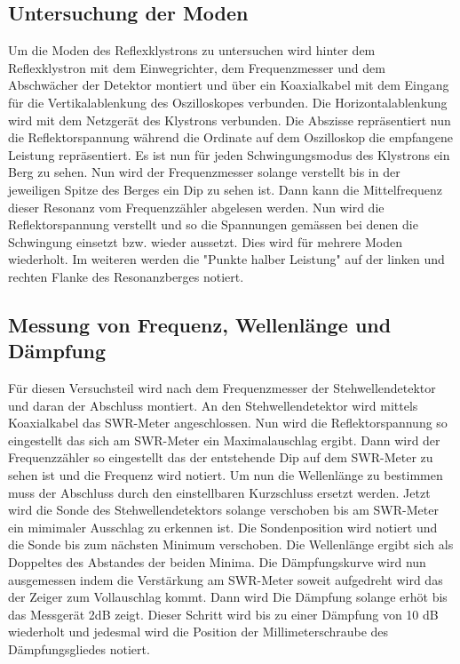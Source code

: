 \subsection{Untersuchung der Moden}
\label{sec:moden}
Um die Moden des Reflexklystrons zu untersuchen wird hinter dem Reflexklystron mit dem Einwegrichter, dem 
Frequenzmesser und dem Abschwächer der Detektor montiert und über ein Koaxialkabel mit dem Eingang
für die Vertikalablenkung des Oszilloskopes verbunden. Die Horizontalablenkung wird mit dem Netzgerät des Klystrons
verbunden. Die Abszisse repräsentiert nun die Reflektorspannung während die Ordinate auf dem Oszilloskop
die empfangene Leistung repräsentiert. Es ist nun für jeden Schwingungsmodus des Klystrons ein Berg zu sehen.
Nun wird der Frequenzmesser solange verstellt bis in der jeweiligen Spitze des Berges ein Dip zu sehen ist.
Dann kann die Mittelfrequenz dieser Resonanz vom Frequenzzähler abgelesen werden. Nun wird die Reflektorspannung
verstellt und so die Spannungen gemässen bei denen die Schwingung einsetzt bzw. wieder aussetzt. Dies wird für mehrere
Moden wiederholt. Im weiteren werden die "Punkte halber Leistung" auf der linken und rechten Flanke des 
Resonanzberges notiert.

\subsection{Messung von Frequenz, Wellenlänge und Dämpfung}
\label{sec:frequenzmessung}
Für diesen Versuchsteil wird nach dem Frequenzmesser der Stehwellendetektor und daran der Abschluss montiert.
An den Stehwellendetektor wird mittels Koaxialkabel das SWR-Meter angeschlossen. Nun wird die Reflektorspannung
so eingestellt das sich am SWR-Meter ein Maximalauschlag ergibt. Dann wird der Frequenzzähler so eingestellt das 
der entstehende Dip auf dem SWR-Meter zu sehen ist und die Frequenz wird notiert. Um nun die Wellenlänge zu bestimmen
muss der Abschluss durch den einstellbaren Kurzschluss ersetzt werden. Jetzt wird die Sonde des Stehwellendetektors
solange verschoben bis am SWR-Meter ein mimimaler Ausschlag zu erkennen ist. Die Sondenposition wird notiert und die
Sonde bis zum nächsten Minimum verschoben. Die Wellenlänge ergibt sich als Doppeltes des Abstandes der beiden 
Minima. Die Dämpfungskurve wird nun ausgemessen indem die Verstärkung am SWR-Meter soweit aufgedreht wird das 
der Zeiger zum Vollauschlag kommt. Dann wird Die Dämpfung solange erhöt bis das Messgerät 2dB zeigt. Dieser Schritt
wird bis zu einer Dämpfung von 10 dB wiederholt und jedesmal wird die Position der Millimeterschraube des 
Dämpfungsgliedes notiert.

\